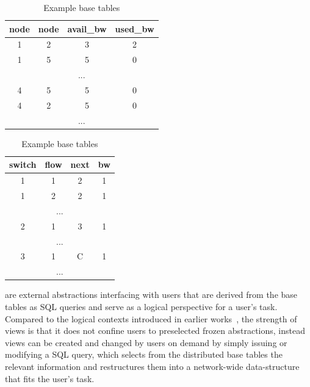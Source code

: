 \begin{table}[ht!]
\begin{subtable}[t]{0.5\linewidth}
  {
    \footnotesize
      \begin{tabular}[t!]{c|c|c|c}
        \centering
        node & node & avail\_bw  & used\_bw \\
        \hline
        1 & 2 & 3 & 2 \\
        1 & 5 & 5 & 0 \\
        \multicolumn{4}{c}{...}\\
        \hline
        4 & 5 & 5 & 0 \\
        4 & 2 & 5 & 0 \\ 
        \multicolumn{4}{c}{...}
        \label{tb:topology}
    \end{tabular}
  }
\end{subtable}
\;
\begin{subtable}[t]{0.45\linewidth}
  {
    \footnotesize
    \centering
    \begin{tabular}[t]{c|c |c|c}
      \centering
      switch & flow & next & bw \\
      \hline
      1 & 1 & 2 & 1 \\
      1 & 2 & 2 & 1  \\
      \multicolumn{4}{c}{...}\\
      \hline
      2 & 1 & 3 & 1 \\
      \multicolumn{4}{c}{...}\\
      \hline
      3 & 1 & C & 1 \\
      \multicolumn{4}{c}{...}
      \label{tb:configuration}
    \end{tabular}
  }
\end{subtable}
\caption{\footnotesize Example base tables}
\label{table:base-table}
\end{table}
\vspace{-1em}

 are external
abstractions interfacing with users that are derived from the base tables as SQL
queries and serve as a logical perspective for a user's task. Compared to the
logical contexts introduced in earlier
works~\cite{ethane-sigcomm07,virtual-forwarding-plane}, the strength
of \Sys views is that it does not confine users to preselected
frozen abstractions, instead \Sys views can be created and changed by
users on demand by simply issuing or modifying a SQL query,
which selects from the distributed base tables the relevant
information and restructures them into a network-wide data-structure
that fits the user's task.


